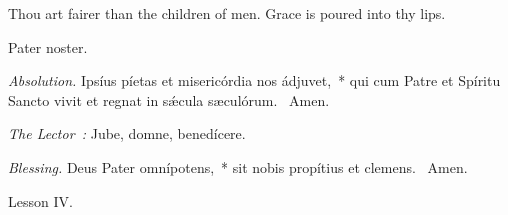 {

  {
    \def\preant{\setgrefactor{17}\large}
    \def\prepsalm{\normalsize}
    \def\anttranslation{We have drunk in thy loving-kindness, O God, in the midst of thy temple.}
  }

  {
    \bigskip
    \def\preant{\setgrefactor{17}\large}
    \def\prepsalm{\normalsize}
    \def\anttranslation{In the Lord's days shall abundance of peace arise and flourish.}
  }

  {
    \bigskip
    \def\preant{\setgrefactor{17}\large}
    \def\prepsalm{\normalsize}
    \def\anttranslation{Truth is sprung out of the earth, and righteousness hath looked down from heaven.}
  }

  \bigskip
  {
    {Thou art fairer than the children of men.}
    {Grace is poured into thy lips.}
  }

  {
    {Pater noster.}

    \emph{Absolution.} Ipsíus píetas et misericórdia nos ádjuvet,~* qui cum Patre et Spíritu Sancto vivit et regnat in sǽcula sæculórum. \Rbar{}~Amen.

    \emph{The Lector~:} Jube, domne, benedícere.

    \emph{Blessing.} Deus Pater omnípotens,~* sit nobis propítius et clemens. \Rbar{}~Amen.
  }

  \bigskip{}
  {


  }

  {
    \hfil{Lesson IV.}\hfil

}}
